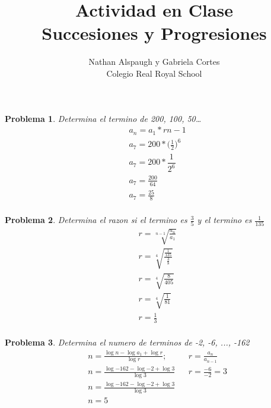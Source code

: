 \documentclass{article}
\title{Actividad en Clase \\ Succesiones y Progresiones}
\author{Nathan Alspaugh y Gabriela Cortes \\ Colegio Real Royal School}
\begin{document}
\maketitle
\newtheorem{successions}{Problema}
\begin{successions}
   Determina el  termino de 200, 100, 50\dots
   \begin{equation}
         \begin{aligned}
              & a_{n} = a_{1} * r{n-1} \\
                & a_{7} = 200 * \bigg(\frac{1}{2}\bigg)^{6} \\
                & a_{7} = 200 * \dfrac{1}{2^6} \\
                & a_{7} = \frac{200}{64} \\
                & a_{7} = \frac{25}{8} \\
         \end{aligned}
   \end{equation}
\end{successions}
\begin{successions}
    Determina el razon si el  termino es \(\frac{3}{5}\) y el  termino es \(\frac{1}{135}\)
    \begin{equation}
        \begin{aligned}
            & r = \sqrt[n-1]{\frac{a_{n}}{a_{1}}} \\
            & r = \sqrt[4]{\frac{\frac{1}{135}}{\frac{3}{8}}} \\
            & r = \sqrt[4]{\frac{8}{405}} \\
            & r = \sqrt[4]{\frac{1}{81}} \\
            & r = \frac{1}{3} \\
        \end{aligned}
    \end{equation}
\end{successions}
\begin{successions}
    Determina el numero de terminos de -2, -6, ..., -162
    \begin{equation}
        \begin{aligned}
            & n = \frac{\log{n} - \log{a_{1}} + \log{r}}{\log{r}}; && r = \frac{a_{n}}{a_{n-1}} \\
            & n = \frac{\log{-162} - \log{-2} + \log{3}}{\log{3}} && r = \frac{-6}{-2} = 3 \\
            & n = \frac{\log{-162} - \log{-2} + \log{3}}{\log{3}} \\
            & n = 5
        \end{aligned}
    \end{equation}
\end{successions}
\end{document}
